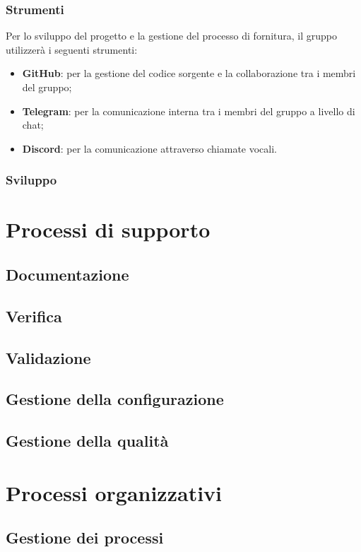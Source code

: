 \documentclass[italian,12pt]{article} %
\begin{document}
\subsubsection{Strumenti}
Per lo sviluppo del progetto e la gestione del processo di fornitura, il gruppo utilizzerà i seguenti strumenti:
\begin{itemize}
	\itemsep0em
	\item \textbf{GitHub}: per la gestione del codice sorgente e la collaborazione tra i membri del gruppo;
	\item \textbf{Telegram}: per la comunicazione interna tra i membri del gruppo a livello di chat;
	\item \textbf{Discord}: per la comunicazione attraverso chiamate vocali.
\end{itemize}

\subsubsection{Sviluppo}

\section{Processi di supporto}
\subsection{Documentazione}
\subsection{Verifica}
\subsection{Validazione}
\subsection{Gestione della configurazione}
\subsection{Gestione della qualità}

\section{Processi organizzativi}
\subsection{Gestione dei processi}
\end{document}
